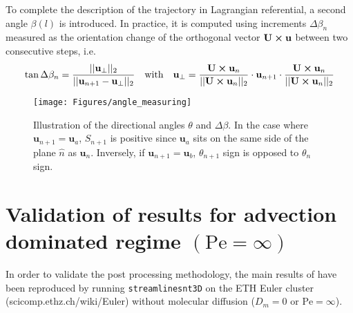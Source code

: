 To complete the description of the trajectory in Lagrangian referential, a second angle $\beta(l)$ is introduced. In practice, it is computed using increments $\Delta \beta_n$ measured as the orientation change of the orthogonal vector $\textbf{U}\cross \textbf{u}$ between two consecutive steps, i.e.
\begin{equation}
\tan\Delta\beta_n = \frac{||\textbf{u}_\perp||_2}{||\textbf{u}_{n+1}-\textbf{u}_\perp||_2}
\quad\textrm{with}\quad
\textbf{u}_\perp =\frac{\textbf{U}\cross\textbf{u}_{n}}{||\textbf{U}\cross\textbf{u}_n||_2}\cdot \textbf{u}_{n+1}\cdot\frac{\textbf{U}\cross\textbf{u}_{n}}{||\textbf{U}\cross\textbf{u}_n||_2}
\end{equation}

\begin{figure}
	\centering
	\texttt{[image: Figures/angle\_measuring]}
	\caption{Illustration of the directional angles $\theta$ and $\Delta \beta$. In the case where $\textbf{u}_{n+1} = \textbf{u}_a$, $S_{n+1}$ is positive since $\textbf{u}_a$ sits on the same side of the plane $\hat{n}$ as $\textbf{u}_n$. Inversely, if $\textbf{u}_{n+1} = \textbf{u}_b$, $\theta_{n+1}$ sign is opposed to $\theta_n$ sign. }
	\label{fig:anglemeasuring}
\end{figure}


\section{Validation of \cite{Meyer2016} results for advection dominated regime $(\mathrm{Pe}=\infty)$}
In order to validate the post processing methodology, the main results of \cite{Meyer2016} have been reproduced by running \texttt{streamlinesnt3D} on the ETH Euler cluster (scicomp.ethz.ch/wiki/Euler) without molecular diffusion ($D_m=0$ or $\mathrm{Pe}=\infty$).\\ 

